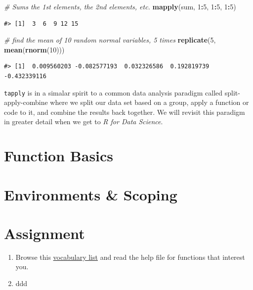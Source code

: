 \documentclass[]{book}
\newenvironment{Shaded}{\begin{snugshade}}{\end{snugshade}}
\newcommand{\KeywordTok}[1]{\textcolor[rgb]{0.13,0.29,0.53}{\textbf{#1}}}
\newcommand{\DecValTok}[1]{\textcolor[rgb]{0.00,0.00,0.81}{#1}}
\newcommand{\CommentTok}[1]{\textcolor[rgb]{0.56,0.35,0.01}{\textit{#1}}}
\newcommand{\OperatorTok}[1]{\textcolor[rgb]{0.81,0.36,0.00}{\textbf{#1}}}
\newcommand{\NormalTok}[1]{#1}
\providecommand{\tightlist}{%
  \setlength{\itemsep}{0pt}\setlength{\parskip}{0pt}}
\theoremstyle{definition}
\theoremstyle{definition}
\theoremstyle{definition}
\theoremstyle{remark}
\begin{document}
\begin{Shaded}
\begin{Highlighting}[]
\CommentTok{# Sums the 1st elements, the 2nd elements, etc. }
\KeywordTok{mapply}\NormalTok{(sum, }\DecValTok{1}\OperatorTok{:}\DecValTok{5}\NormalTok{, }\DecValTok{1}\OperatorTok{:}\DecValTok{5}\NormalTok{, }\DecValTok{1}\OperatorTok{:}\DecValTok{5}\NormalTok{) }
\end{Highlighting}
\end{Shaded}

\begin{verbatim}
#> [1]  3  6  9 12 15
\end{verbatim}

\begin{Shaded}
\begin{Highlighting}[]
\CommentTok{# find the mean of 10 random normal variables, 5 times}
\KeywordTok{replicate}\NormalTok{(}\DecValTok{5}\NormalTok{, }\KeywordTok{mean}\NormalTok{(}\KeywordTok{rnorm}\NormalTok{(}\DecValTok{10}\NormalTok{)))}
\end{Highlighting}
\end{Shaded}

\begin{verbatim}
#> [1]  0.009560203 -0.082577193  0.032326586  0.192819739 -0.432339116
\end{verbatim}

\texttt{tapply} is in a simalar spirit to a common data analysis
paradigm called split-apply-combine where we split our data set based on
a group, apply a function or code to it, and combine the results back
together. We will revisit this paradigm in greater detail when we get to
\emph{R for Data Science}.

\section{Function Basics}\label{function-basics}

\section{Environments \& Scoping}\label{environments-scoping}

\section{Assignment}\label{assignment-1}

\begin{enumerate}
\def\labelenumi{\arabic{enumi}.}
\tightlist
\item
  Browse this \href{http://adv-r.had.co.nz/Vocabulary.html}{vocabulary
  list} and read the help file for functions that interest you.
\item
  ddd
\end{enumerate}
\end{document}
